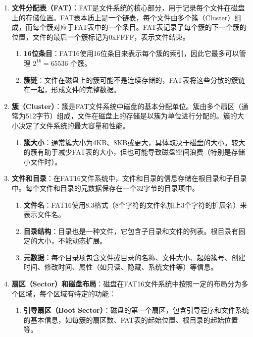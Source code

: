 \begin{enumerate}
    \item \textbf{文件分配表（FAT）}：FAT是文件系统的核心部分，用于记录每个文件在磁盘上的存储位置。FAT表本质上是一个链表，每个文件由多个簇（Cluster）组成，而每个簇对应于FAT表中的一个条目。FAT表记录了每个簇的下一个簇的位置，文件的最后一个簇标记为0xFFFF，表示文件结束。
          \begin{enumerate}
              \item \textbf{16位条目}：FAT16使用16位条目来表示每个簇的索引，因此它最多可以管理 $2^16 = 65536$ 个簇。
              \item \textbf{簇链}：文件在磁盘上的簇可能不是连续存储的，FAT表将这些分散的簇链在一起，形成文件的完整数据。
          \end{enumerate}
    \item \textbf{簇（Cluster）}：簇是FAT文件系统中磁盘的基本分配单位。簇由多个扇区（通常为512字节）组成，文件在磁盘上的存储是以簇为单位进行分配的。簇的大小决定了文件系统的最大容量和性能。
          \begin{enumerate}
              \item \textbf{簇大小}：通常簇大小为4KB、8KB或更大，具体取决于磁盘的大小。较大的簇有助于减少FAT表的大小，但也可能导致磁盘空间浪费（特别是存储小文件时）。
          \end{enumerate}
    \item \textbf{文件和目录}：在FAT16文件系统中，文件和目录的信息存储在根目录和子目录中。每个文件和目录的元数据保存在一个32字节的目录项中。
          \begin{enumerate}
              \item \textbf{文件名}：FAT16使用8.3格式（8个字符的文件名加上3个字符的扩展名）来表示文件名。
              \item \textbf{目录结构}：目录也是一种文件，它包含子目录和文件的列表。根目录有固定的大小，不能动态扩展。
              \item \textbf{元数据}：每个目录项包含文件或目录的名称、文件大小、起始簇号、创建时间、修改时间、属性（如只读、隐藏、系统文件等）等信息。
          \end{enumerate}
    \item \textbf{扇区（Sector）和磁盘布局}：磁盘在FAT16文件系统中按照一定的布局分为多个区域，每个区域有特定的功能：
          \begin{enumerate}
              \item \textbf{引导扇区（Boot Sector）}：磁盘的第一个扇区，包含引导程序和文件系统的基本信息，如每簇的扇区数、FAT表的起始位置、根目录的起始位置等。

\end{enumerate}
\end{enumerate}
